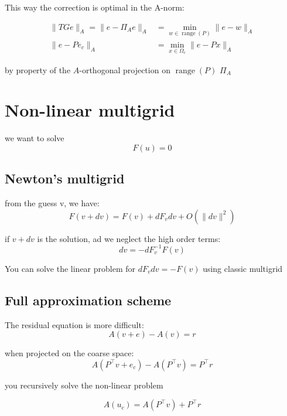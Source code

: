 \documentclass{article}
\DeclareMathOperator{\range}{range}
\begin{document}
This way the correction is optimal in the A-norm:

\begin{align*}
      \|TGe\|_{A} = \|e - \Pi_{A}e\|_{A} & = \min_{w \in \range(P)}{\|e - w\|_{A}} \\ 
                    \|e - Pe_{c}\|_{A}   & = \min_{x \in \Omega_{c}}{\|e - Px\|_{A}}
\end{align*}


by property of the $A$-orthogonal projection on $\range(P)$ $\Pi_{A}$

\section{Non-linear multigrid}

we want to solve
\[
F(u) = 0
\]

\subsection{Newton's multigrid}

from the guess v, we have:
\[
F(v + dv) = F(v) + dF_{v}dv + O(\|dv\|^{2})
\]

if $v + dv$ is the solution, ad we neglect the high order terms:
\[
dv = -dF_{v}^{-1}F(v)
\]

You can solve the linear problem for $dF_{v}dv = -F(v)$ using classic multigrid

\subsection{Full approximation scheme}

The residual equation is more difficult:
\[
A(v + e) - A(v) = r
\]

when projected on the coarse space:
\[
A(P^{\top}v + e_{c}) - A(P^{\top}v) = P^{\top}r
\]

you recursively solve the non-linear problem

\[
A(u_{c}) = A(P^{\top}v) + P^{\top}r
\]
\end{document}
